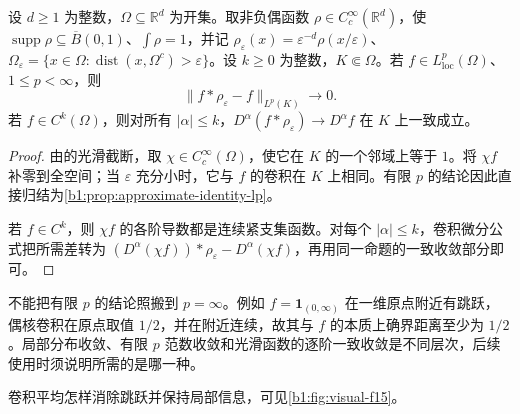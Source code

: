 \begin{proposition}\label{b1:prop:local-smoothing-approximation}
设 \(d\geq1\) 为整数，\(\Omega\subseteq\mathbb R^d\) 为开集。取非负偶函数 \(\rho\in C_c^\infty(\mathbb R^d)\)，使 \(\operatorname{supp}\rho\subseteq\overline B(0,1)\)、\(\int\rho=1\)，并记 \(\rho_\varepsilon(x)=\varepsilon^{-d}\rho(x/\varepsilon)\)、\(\Omega_\varepsilon=\{x\in\Omega:\operatorname{dist}(x,\Omega^c)>\varepsilon\}\)。设 \(k\geq0\) 为整数，\(K\Subset\Omega\)。若 \(f\in L^p_{\mathrm{loc}}(\Omega)\)、\(1\le p<\infty\)，则
\[
 \|f*\rho_\varepsilon-f\|_{L^p(K)}\longrightarrow0.
\]
若 \(f\in C^k(\Omega)\)，则对所有 \(|\alpha|\le k\)，\(D^\alpha(f*\rho_\varepsilon)\to D^\alpha f\) 在 \(K\) 上一致成立。
\end{proposition}
\begin{proof}
由的光滑截断，取 \(\chi\in C_c^\infty(\Omega)\)，使它在 \(K\) 的一个邻域上等于 \(1\)。将 \(\chi f\) 补零到全空间；当 \(\varepsilon\) 充分小时，它与 \(f\) 的卷积在 \(K\) 上相同。有限 \(p\) 的结论因此直接归结为\cref{b1:prop:approximate-identity-lp}。

若 \(f\in C^k\)，则 \(\chi f\) 的各阶导数都是连续紧支集函数。对每个 \(|\alpha|\le k\)，卷积微分公式把所需差转为 \((D^\alpha(\chi f))*\rho_\varepsilon-D^\alpha(\chi f)\)，再用同一命题的一致收敛部分即可。
\end{proof}

不能把有限 \(p\) 的结论照搬到 \(p=\infty\)。例如 \(f=\mathbf1_{(0,\infty)}\) 在一维原点附近有跳跃，偶核卷积在原点取值 \(1/2\)，并在附近连续，故其与 \(f\) 的本质上确界距离至少为 \(1/2\)。局部分布收敛、有限 \(p\) 范数收敛和光滑函数的逐阶一致收敛是不同层次，后续使用时须说明所需的是哪一种。

卷积平均怎样消除跳跃并保持局部信息，可见\cref{b1:fig:visual-f15}。

